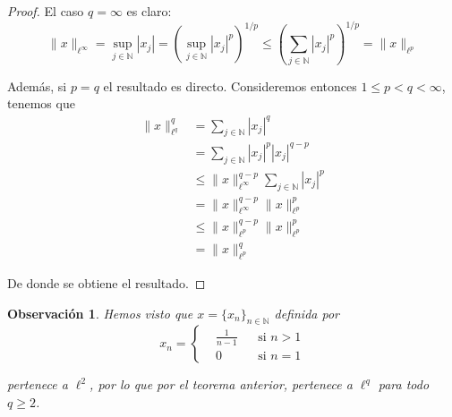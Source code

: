 \documentclass{article}
\newcommand{\N}{\mathbb{N}}
\newcommand{\twodef}[4]{\left\{ \begin{aligned}
						&#1	&&\text{si } #2	\\
						&#3	&&\text{si } #4
					\end{aligned} \right. }
\newtheorem{obst}{Observación}[teo]
\begin{document}
\begin{proof} El caso $q = \infty$ es claro:
	$$\|x\|_{\ell^{\infty}} 
		= 	\sup_{j \in \N} |x_{j}|
		= 	\left(\sup_{j \in \N} |x_{j}|^{p}\right)^{1/p} 
		\leq	\left(\sum_{j \in \N} |x_{j}|^{p}\right)^{1/p} = \|x\|_{\ell^{p}}
	$$

Además, si $p = q$ el resultado es directo. Consideremos entonces $1 \leq p < q < \infty$, tenemos que
	\begin{align*}
		\|x\|_{\ell^{q}}^{q}
			&=		\sum_{j \in \N} |x_{j}|^{q}	\\
			&=		\sum_{j \in \N} |x_{j}|^{p} |x_{j}|^{q-p}	\\
			&\leq		\|x\|^{q-p}_{\ell^{\infty}} \sum_{j \in \N} |x_{j}|^{p}	\\
			&=		\|x\|^{q-p}_{\ell^{\infty}} \|x\|_{\ell^{p}}^{p}	\\
			&\leq		\|x\|^{q-p}_{\ell^{p}} \|x\|_{\ell^{p}}^{p}	\\
			&=		\|x\|_{\ell^{p}}^{q}		 
	\end{align*}

De donde se obtiene el resultado.
\end{proof}                                          

\begin{obst} Hemos visto que $x = \{x_{n}\}_{n \in \N}$ definida por
	$$x_{n} = \twodef	{\frac{1}{n-1}} {n > 1}
					{0}{n = 1}$$

pertenece a $\ell^{2}$, por lo que por el teorema anterior, pertenece a $\ell^{q}$ para todo $q \geq 2$.
\end{obst}
\end{document}
